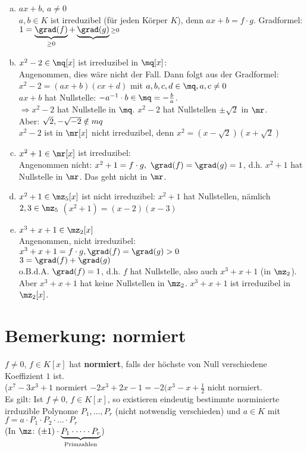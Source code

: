 	\begin{enumerate}[a)]
	\item $ax+b$, $a\neq 0$\\
	$a,b\in K$ ist irreduzibel (für jeden Körper $K$), denn $ax+b=f\cdot g$. Gradformel: $1=\underbrace{\grad(f)}_{\scriptstyle \geq 0}+\underbrace{\grad(g)}{\scriptstyle \geq 0}$
	\item $x^2-2\in\mq[x]$ ist irreduzibel in $\mq[x]$:\\
	Angenommen, dies wäre nicht der Fall. Dann folgt aus der Gradformel: $x^2-2=(ax+b)(cx+d)$ mit $a,b,c,d\in\mq,a,c\neq 0$\\
	$ax+b$ hat Nullstelle: $-a^{-1}\cdot b\in\mq=-\frac{b}{a}$.\\
	$\Rightarrow x^2-2$ hat Nullstelle in $\mq$. $x^2-2$ hat Nullstellen $\pm\sqrt{2}$ in $\mr$.\\
	Aber: $\sqrt{2},-\sqrt{-2}\notin\\mq$\\
	$x^2-2$ ist in $\mr[x]$ nicht irreduzibel, denn $x^2=(x-\sqrt{2})(x+\sqrt{2})$
	\item $x^2+1\in\mr[x]$ ist irreduzibel:\\
	Angenommen nicht: $x^2+1=f\cdot g,\ \grad(f)=\grad(g)=1$,
	d.h. $x^2+1$ hat Nullstelle in $\mr$. Das geht nicht in $\mr$.
	\item $x^2+1\in\mz_5[x]$ ist nicht irreduzibel: $x^2+1$ hat Nullstellen, nämlich $2,3\in\mz_5$ $(x^2+1)=(x-2)(x-3)$
	\item $x^3+x+1\in\mz_2[x]$\\
	Angenommen, nicht irreduzibel:\\
	$x^3+x+1=f\cdot g,\grad(f)=\grad(g)>0$\\
	$3=\grad(f)+\grad(g)$\\
	o.B.d.A. $\grad(f)=1$, d.h. $f$ hat Nullstelle, also auch $x^3+x+1$ (in $\mz_2$). Aber $x^3+x+1$ hat keine Nullstellen in $\mz_2$. $x^3+x+1$ ist irreduzibel in $\mz_2[x]$.
	\end{enumerate}

	\section{Bemerkung: normiert}

	$f\neq 0$, $f\in K[x]$ hat \textbf{normiert}, falls der höchste von Null verschiedene Koeffizient $1$ ist.\\
	($x^7-3x^3+1$ normiert $-2x^3+2x-1=-2(x^3-x+\frac{1}{2}$ nicht normiert.\\
	Es gilt: Ist $f\neq 0$, $f\in K[x]$, so existieren eindeutig bestimmte norminierte irrduzible Polynome $P_1,...,P_r$ (nicht notwendig verschieden) und $a\in K$ mit $f=a\cdot P_1\cdot P_2\cdot\dots\cdot P_r$\\
	(In $\mz$: $(\pm 1)\cdot \underbrace{P_1\cdot\dots\cdot P_r}_{\mbox{\scriptsize Primzahlen}}$)
